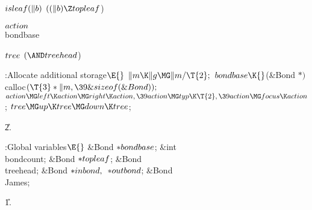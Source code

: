 \Y\B\4\D$\\{isleaf}(\|b)$ \5
$((\|b)\Z\\{topleaf}{}$)\par
\B\4\D$\\{action}$ \5
\\{bondbase}\par
\B\4\D$\\{tree}$ \5
$({\AND}\\{treehead}{}$)\par
\Y\B\4:Allocate additional storage\X${}\E{}$\6
$\|m\K\|g\MG\|m/\T{2};{}$\6
${}\\{bondbase}\K{}$(\&{Bond} ${}{*}){}$ \\{calloc}${}(\T{3}*\|m,\39\&{sizeof}(%
\&{Bond}));{}$\6
${}\\{action}\MG\\{left}\K\\{action}\MG\\{right}\K\\{action},\39\\{action}\MG%
\\{typ}\K\T{2},\39\\{action}\MG\\{focus}\K\\{action}{}$;\6
${}\\{tree}\MG\\{up}\K\\{tree}\MG\\{down}\K\\{tree}{}$;\par
\U2.\fi

\B{}:Global variables\X${}\E{}$\6
\&{Bond} ${}{*}\\{bondbase}{}$;\6
\&{int} \\{bondcount};\6
\&{Bond} ${}{*}\\{topleaf}{}$;\6
\&{Bond} \\{treehead};\6
\&{Bond} ${}{*}\\{inbond},{}$ ${}{*}\\{outbond}{}$;\6
\&{Bond} \\{James};\par
\U1.\fi

